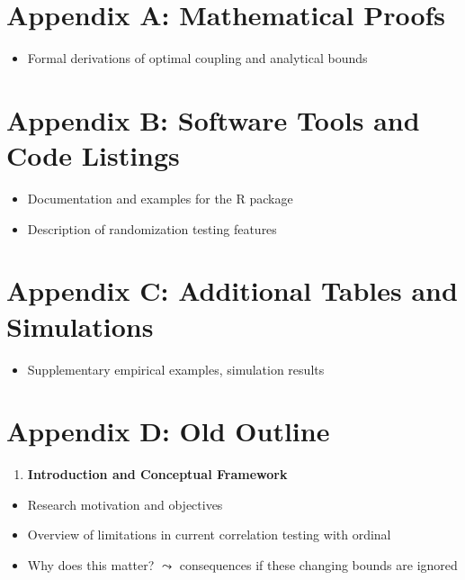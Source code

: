 \documentclass[
  12pt,
]{article}
\providecommand{\tightlist}{%
  \setlength{\itemsep}{0pt}\setlength{\parskip}{0pt}}\usepackage{longtable,booktabs,array}
\theoremstyle{plain}
\theoremstyle{definition}
\theoremstyle{remark}
\begin{document}
\newpage

\appendix

\section{Appendix A: Mathematical
Proofs}\label{appendix-a-mathematical-proofs}

\begin{itemize}
\tightlist
\item
  Formal derivations of optimal coupling and analytical bounds
\end{itemize}

\section{Appendix B: Software Tools and Code
Listings}\label{appendix-b-software-tools-and-code-listings}

\begin{itemize}
\tightlist
\item
  Documentation and examples for the R package\\
\item
  Description of randomization testing features
\end{itemize}

\section{Appendix C: Additional Tables and
Simulations}\label{appendix-c-additional-tables-and-simulations}

\begin{itemize}
\tightlist
\item
  Supplementary empirical examples, simulation results
\end{itemize}

\section{Appendix D: Old Outline}\label{appendix-d-old-outline}

\begin{enumerate}
\def\labelenumi{\arabic{enumi}.}
\tightlist
\item
  \textbf{Introduction and Conceptual Framework}
\end{enumerate}

\begin{itemize}
\tightlist
\item
  Research motivation and objectives
\item
  Overview of limitations in current correlation testing with ordinal
\item
  Why does this matter? \(\leadsto\) consequences if these changing
  bounds are ignored
\end{itemize}
\end{document}
